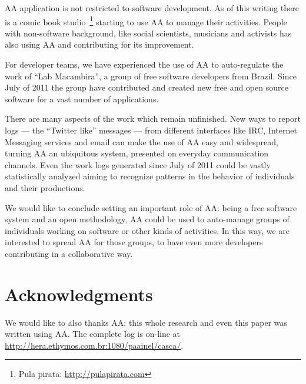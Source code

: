 \documentclass[letterpaper]{article}
\begin{document}
AA application is not restricted to software development. As of this
writing there is a comic book studio~\footnote{Pula pirata:
  \url{http://pulapirata.com}} starting to use AA to manage their
activities. People with non-software background, like social
scientists, musicians and activists has also using AA and contributing
for its improvement.

For developer teams, we have experienced the use of AA to
auto-regulate the work of ``Lab Macambira'', a group of free software
developers from Brazil. Since July of 2011 the group have contributed
and created new free and open source software for a vast number of
applications.

There are many aspects of the work which remain unfinished. New ways
to report logs --- the ``Twitter like'' messages --- from different
interfaces like IRC, Internet Messaging services and email can make
the use of AA easy and widespread, turning AA an ubiquitous system,
presented on everyday communication channels. Even the work logs
generated since July of 2011 could be vastly statistically analyzed
aiming to recognize patterns in the behavior of individuals and their
productions.

We would like to conclude setting an important role of AA: being a
free software system and an open methodology, AA could be used to
auto-manage groups of individuals working on software or other kinds
of activities. In this way, we are interested to spread AA for those
groups, to have even more developers contributing in a collaborative
way.

\section*{Acknowledgments}

We would like to also thanks AA: this whole research and even this
paper was written using AA. The complete log is on-line at
\url{http://hera.ethymos.com.br:1080/paainel/casca/}.


\nocite{last2003}
\nocite{german2003}
\nocite{carmel1999}
\nocite{carmel2001}
\nocite{komi2005}
\nocite{battin2001}

%
%


\end{document}
